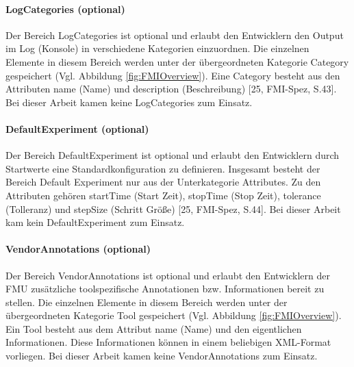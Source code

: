 \paragraph{LogCategories (optional)}\label{sec:LogCategories}
\noindent Der Bereich LogCategories ist optional und erlaubt den Entwicklern den Output im Log (Konsole) in verschiedene Kategorien einzuordnen. Die einzelnen Elemente in diesem Bereich werden unter der übergeordneten Kategorie Category gespeichert (Vgl. Abbildung \ref{fig:FMIOverview}). Eine Category besteht aus den Attributen name (Name) und description (Beschreibung) [25, FMI-Spez, S.43].
\newline
Bei dieser Arbeit kamen keine LogCategories zum Einsatz.

\paragraph{DefaultExperiment (optional)}\label{sec:DefaultExperiment}
\noindent Der Bereich DefaultExperiment ist optional und erlaubt den Entwicklern durch Startwerte eine Standardkonfiguration zu definieren. Insgesamt besteht der Bereich Default Experiment nur aus der Unterkategorie Attributes. Zu den Attributen gehören startTime (Start Zeit), stopTime (Stop Zeit), tolerance (Tolleranz) und stepSize (Schritt Größe) [25, FMI-Spez, S.44].
\newline
Bei dieser Arbeit kam kein DefaultExperiment zum Einsatz.

\paragraph{VendorAnnotations (optional)}\label{sec:VendorAnnotations}
\noindent Der Bereich VendorAnnotations ist optional und erlaubt den Entwicklern der FMU zusätzliche toolspezifische Annotationen bzw. Informationen bereit zu stellen. Die einzelnen Elemente in diesem Bereich werden unter der übergeordneten Kategorie Tool gespeichert (Vgl. Abbildung \ref{fig:FMIOverview}). Ein Tool besteht aus dem Attribut name (Name) und den eigentlichen Informationen. Diese Informationen können in einem beliebigen XML-Format vorliegen.
\newline
Bei dieser Arbeit kamen keine VendorAnnotations zum Einsatz.

